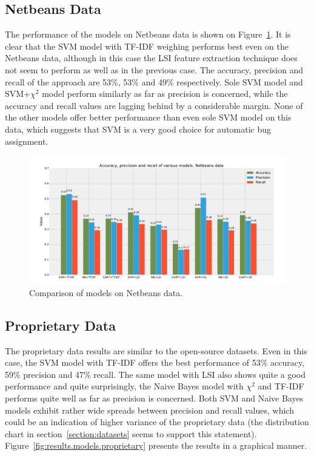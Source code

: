 \subsection{Netbeans Data}

The performance of the models on Netbeans data is shown on Figure~\ref{fig:results.models.netbeans}. It is clear that the SVM model with TF-IDF weighing performs best even on the Netbeans data, although in this case the LSI feature extraction technique does not seem to perform as well as in the previous case. The accuracy, precision and recall of the approach are 53\%, 53\% and 49\% respectively. Sole SVM model and SVM+$\chi^2$ model perform similarly as far as precision is concerned, while the accuracy and recall values are lagging behind by a considerable margin. None of the other models offer better performance than even sole SVM model on this data, which suggests that SVM is a very good choice for automatic bug assignment.

\begin{figure}[htbp]
    \centering
        \includegraphics[width=\textwidth]{./images/comparison_of_models/netbeans.pdf}
    \caption{Comparison of models on Netbeans data.}
    \label{fig:results.models.netbeans}
\end{figure}

\subsection{Proprietary Data}

The proprietary data results are similar to the open-source datasets. Even in this case, the SVM model with TF-IDF offers the best performance of 53\% accuracy, 59\% precision and 47\% recall. The same model with LSI also shows quite a good performance and quite surprisingly, the Naive Bayes model with $\chi^2$ and TF-IDF performs quite well as far as precision is concerned. Both SVM and Naive Bayes models exhibit rather wide spreads between precision and recall values, which could be an indication of higher variance of the proprietary data (the distribution chart in section~\ref{section:datasets} seems to support this statement). Figure~\ref{fig:results.models.proprietary} presents the results in a graphical manner.

